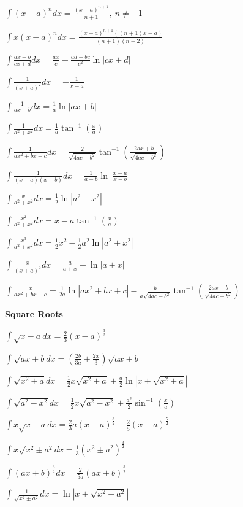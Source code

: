 \documentclass[8pt,a4paper]{extarticle}     %
\theoremstyle{definition}
\theoremstyle{definition}
\theoremstyle{definition}
\begin{document}
\begin{multicols}{4}
\begin{bulletlist}
	\item $\int (x+a)^n dx=\frac{(x+a)^{n+1}}{n+1}, \ n\neq-1$
	\item $\int x(x+a)^n dx=\frac{(x+a)^{n+1}((n+1)x-a)}{(n+1)(n+2)}$	
	\item $\int \frac{ax+b}{cx+d}dx = \frac{ax}{c}-\frac{ad-bc}{c^2}\ln|cx+d|$
	\item $\int \frac{1}{(x+a)^2}dx = -\frac{1}{x+a}$
	\item $\int \frac{1}{ax+b}dx = \frac{1}{a}\ln|ax+b|$ 
	\item $\int \frac{1}{a^2+x^2}dx = \frac{1}{a}\tan^{-1}\left(\frac{x}{a}\right)$
	\item $\int \frac{1}{ax^2+bx+c}dx = \frac{2}{\sqrt{4ac-b^2}}\tan^{-1}\left(\frac{2ax+b}{\sqrt{4ac-b^2}}\right)$
	\item $\int \frac{1}{(x-a)(x-b)}dx = \frac{1}{a-b}\ln\left|\frac{x-a}{x-b}\right|$
	\item $\int \frac{x}{a^2+x^2}dx = \frac{1}{2}\ln\left|a^2+x^2\right|$
	\item $\int \frac{x^2}{a^2+x^2}dx = x-a\tan^{-1}\left(\frac{x}{a}\right)$
	\item $\int \frac{x^3}{a^2+x^2}dx = \frac{1}{2}x^2-\frac{1}{2}a^2\ln\left|a^2+x^2\right|$
	\item $\int \frac{x}{(x+a)^2}dx = \frac{a}{a+x}+ \ln\left|a+x\right|$
	\item $\int \frac{x}{ax^2+bx+c} = \frac{1}{2a}\ln\left|ax^2+bx+c\right|-\frac{b}{a\sqrt{4ac-b^2}}\tan^{-1}\left(\frac{2ax+b}{\sqrt{4ac-b^2}}\right)$
	\item [] \textbf{Square Roots}
	\item $\int \sqrt{x-a}dx = \frac{2}{3}(x-a)^{\frac{3}{2}}$
	\item $\int \sqrt{ax+b}dx = \left(\frac{2b}{3a}+\frac{2x}{3}\right)\sqrt{ax+b}$
	\item $\int \sqrt{x^2+a}dx = \frac{1}{2}x\sqrt{x^2+a}+\frac{a}{2}\ln|x+\sqrt{x^2+a}|$
	\item $\int \sqrt{a^2-x^2}dx = \frac{1}{2}x\sqrt{a^2-x^2}+\frac{a^2}{2}\sin^{-1}\left(\frac{x}{a}\right)$
	\item $\int x\sqrt{x-a}dx = \frac{2}{3}a(x-a)^{\frac{3}{2}}+\frac{2}{5}(x-a)^{\frac{5}{2}}$
	\item $\int x\sqrt{x^2 \pm a^2}dx = \frac{1}{3}(x^2 \pm a^2)^{\frac{3}{2}}$	
	\item $\int (ax+b)^{\frac{3}{2}}dx = \frac{2}{5a}(ax+b)^{\frac{5}{2}}$
	\item $\int \frac{1}{\sqrt{x^2 \pm a^2}}dx = \ln\left|x+\sqrt{x^2 \pm a^2}\right|$

\end{bulletlist}
\end{multicols}
\end{document}
